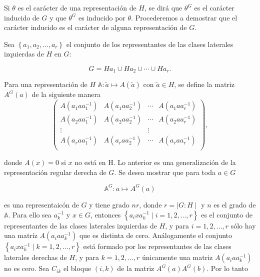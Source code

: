 \documentclass[12pt]{book}
\theoremstyle{definition}
\newcounter{in}
\begin{document}
Si $\theta$ es el carácter de una representación de $H$, se dirá que
$\theta^{G}$ es el carácter inducido de $G$ y que $\theta^{G}$ es
inducido por $\theta$. Procederemos a demostrar que el carácter
inducido es el carácter de alguna representación de $G$.

Sea $\left\{ a_{1}, a_{2},\ldots,a_{r}\right\}$ el conjunto de los
representantes de las clases laterales izquierdas de $H$ en $G$:

\begin{equation*}
  G = Ha_{1} \cup Ha_{2} \cup \cdots \cup Ha_{r}.
\end{equation*}

Para una representación de $H$
$\mathbb{A} \colon \tilde{a} \mapsto A(\tilde{a})$ con
$\tilde{a} \in H$, se define la matriz $A^{G}(a)$ de la siguiente
manera
\begin{equation*}
  \begin{pmatrix}
    A(a_{1} a a_{1}^{-1}) & A(a_{1} a a_{2}^{-1}) & \cdots &  A(a_{1} a a_{r}^{-1}) \\
    A(a_{2} a a_{1}^{-1}) & A(a_{2} a a_{2}^{-1}) & \cdots &  A(a_{2} a a_{r}^{-1}) \\
    \vdots &  & \vdots \\
    A(a_{r} a a_{1}^{-1}) & A(a_{r} a a_{2}^{-1}) & \cdots &  A(a_{r} a a_{r}^{-1}) \\
  \end{pmatrix},
\end{equation*}

donde $A(x)=0$ si $x$ no está en H. Lo anterior es una generalización
de la representación regular derecha de $G$. Se desea mostrar que para
toda $a \in G$

\begin{equation*}
  \mathbb{A}^{G} \colon a \mapsto A^{G}(a)
\end{equation*}

es una representaicón de $G$ y tiene grado $nr$, donde
$r= \mid G : H \mid$ y $n$ es el grado de $\mathbb{A}$. Para ello sea
$a_{k}^{-1}$ y $x \in G$, entonces
$\left\{ a_{i} x a_{k}^{-1} \mid i = 1, 2, \ldots, r \right\}$ es el
conjunto de representantes de las clases laterales izquierdas de $H$,
y para $i = 1, 2, \ldots, r$ sólo hay una matríz
$A(a_{i} a a_{k}^{-1})$ que es distinta de cero. Análogamente el
conjunto
$\left\{ a_{i} x a_{k}^{-1} \mid k = 1, 2, \ldots, r \right\}$ está
formado por los representantes de las clases laterales derechas de
$H$, y para $ k = 1, 2, \ldots, r$ únicamente una matriz
$A(a_{i} a a_{k}^{-1})$ no es cero. Sea $C_{ik}$ el bloque $(i,k)$ de
la matriz $A^{G}(a)A^{G}(b)$. Por lo tanto
\end{document}
